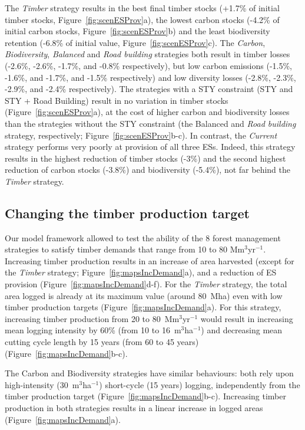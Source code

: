 \documentclass{article}
\begin{document}
The \textit{Timber} strategy results in the best final timber stocks (+1.7\% of initial timber stocks, Figure~\ref{fig:scenESProv}a), the lowest carbon stocks (-4.2\% of initial carbon stocks, Figure~\ref{fig:scenESProv}b) and the least biodiversity retention (-6.8\% of initial value, Figure~\ref{fig:scenESProv}c). The \textit{Carbon}, \textit{Biodiversity}, \textit{Balanced} and \textit{Road building} strategies both result in timber losses (-2.6\%, -2.6\%, -1.7\%, and -0.8\% respectively), but low carbon emissions (-1.5\%, -1.6\%, and -1.7\%, and -1.5\% respectively) and low diversity losses (-2.8\%, -2.3\%, -2.9\%, and -2.4\% respectively). The strategies with a STY constraint (STY and STY + Road Building) result in no variation in timber stocks (Figure~\ref{fig:scenESProv}a), at the cost of higher carbon and biodiversity losses than the strategies without the STY constraint (the Balanced and \textit{Road building} strategy, respectively; Figure~\ref{fig:scenESProv}b-c). In contrast, the \textit{Current} strategy performs very poorly at provision of all three ESs. Indeed, this strategy results in the highest reduction of timber stocks (-3\%) and the second highest reduction of carbon stocks (-3.8\%) and biodiversity (-5.4\%), not far behind the \textit{Timber} strategy. 


\subsection{Changing the timber production target}

Our model framework allowed to test the ability of the 8 forest management strategies to satisfy timber demands that range from 10 to 80 Mm$^3$yr$^{-1}$. Increasing timber production results in an increase of area harvested (except for the \textit{Timber} strategy; Figure~\ref{fig:mapsIncDemand}a), and a reduction of ES provision (Figure~\ref{fig:mapsIncDemand}d-f). For the \textit{Timber} strategy, the total area logged is already at its maximum value (around 80~Mha) even with low timber production targets (Figure~\ref{fig:mapsIncDemand}a). For this strategy, increasing timber production from 20 to 80~Mm$^3$yr$^{-1}$ would result in increasing mean logging intensity by 60\% (from 10 to 16~m$^3$ha$^{-1}$) and decreasing mean cutting cycle length by 15 years (from 60 to 45 years) (Figure~\ref{fig:mapsIncDemand}b-c).

The Carbon and Biodiversity strategies have similar behaviours: both rely upon high-intensity (30~m$^3$ha$^{-1}$) short-cycle (15 years) logging, independently from the timber production target (Figure~\ref{fig:mapsIncDemand}b-c). Increasing timber production in both strategies results in a linear increase in logged areas (Figure~\ref{fig:mapsIncDemand}a).
\end{document}
